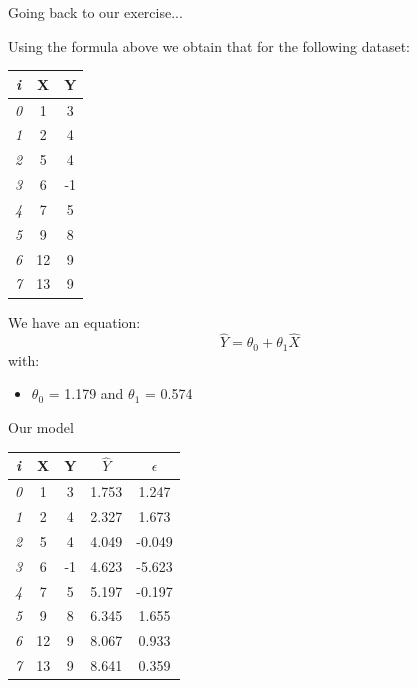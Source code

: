 \documentclass{beamer}
\begin{document}
\begin{frame}
{\centerline{Going back to our exercise... }}

Using the formula above we obtain that for the following dataset:

\begin{table}[h!]
\small
  \begin{center}
    \begin{tabular}{|c|c|c|}      
    \toprule
         \textit{i} & \textbf{X} & \textbf{Y} \\
    \midrule    \midrule
	\textit{0} &1 & 3 \\
	\textit{1} &2 & 4 \\
	\textit{2} &5 & 4 \\
	\textit{3} &6 & -1 \\
	\textit{4} &7 & 5 \\
	\textit{5} &9 & 8 \\
	\textit{6} &12 & 9 \\
	\textit{7} &13 & 9 \\ \bottomrule
    \end{tabular}
  \end{center}
\end{table}


We have an equation:
$$ \hat{Y} = \theta_0 + \theta_1 \hat{X} $$
with:
\begin{itemize}
\item $\theta_0$ = 1.179 and  $\theta_1$ = 0.574

\end{itemize}

\end{frame}

\begin{frame}
{\centerline{Our model }}


\begin{table}[h!]
\small
  \begin{center}
    \begin{tabular}{|c|c|c|c|c|}      
    \toprule
     \textit{i} & \textbf{X} & \textbf{Y} & \textbf{$\hat{Y}$} & \textbf{$\epsilon$}\\
    \midrule    \midrule
	\textit{0} &1 & 3 & 1.753 & 1.247 \\
	\textit{1} &2 & 4 & 2.327 & 1.673 \\
	\textit{2} &5 & 4  & 4.049 & -0.049\\
	\textit{3} &6 & -1 & 4.623 & -5.623 \\
	\textit{4} &7 & 5  & 5.197 & -0.197\\
	\textit{5} &9 & 8  & 6.345 & 1.655\\
	\textit{6} &12 & 9  & 8.067 & 0.933\\
	\textit{7} &13 & 9  & 8.641 & 0.359\\ \bottomrule
    \end{tabular}
  \end{center}
\end{table}


\end{frame}
\end{document}
